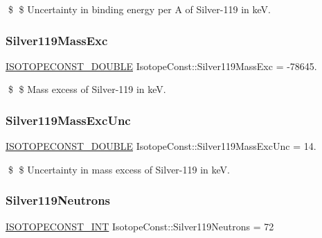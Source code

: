 \$ \$ Uncertainty in binding energy per A of Silver-\/119 in keV. \mbox{\label{group___isotope_const-_silver-_ag119_ga3568193639521feebc60759800afce7d}} 
\subsubsection{\texorpdfstring{Silver119\+Mass\+Exc}{Silver119MassExc}}
{\footnotesize\ttfamily \mbox{\hyperlink{group___isotope_const-_macros_ga8f45a7272ce02c0b4c65c44636ed719a}{I\+S\+O\+T\+O\+P\+E\+C\+O\+N\+S\+T\+\_\+\+D\+O\+U\+B\+LE}} Isotope\+Const\+::\+Silver119\+Mass\+Exc = -\/78645.}

\$ \$ Mass excess of Silver-\/119 in keV. \mbox{\label{group___isotope_const-_silver-_ag119_gadf15994fc342f9b0fae238a020dd5af4}} 
\subsubsection{\texorpdfstring{Silver119\+Mass\+Exc\+Unc}{Silver119MassExcUnc}}
{\footnotesize\ttfamily \mbox{\hyperlink{group___isotope_const-_macros_ga8f45a7272ce02c0b4c65c44636ed719a}{I\+S\+O\+T\+O\+P\+E\+C\+O\+N\+S\+T\+\_\+\+D\+O\+U\+B\+LE}} Isotope\+Const\+::\+Silver119\+Mass\+Exc\+Unc = 14.}

\$ \$ Uncertainty in mass excess of Silver-\/119 in keV. \mbox{\label{group___isotope_const-_silver-_ag119_gad013187d2e89ad47afd5fdfd9871ae27}} 
\subsubsection{\texorpdfstring{Silver119\+Neutrons}{Silver119Neutrons}}
{\footnotesize\ttfamily \mbox{\hyperlink{group___isotope_const-_macros_ga5f18360b3e99483a35c32d789e62621c}{I\+S\+O\+T\+O\+P\+E\+C\+O\+N\+S\+T\+\_\+\+I\+NT}} Isotope\+Const\+::\+Silver119\+Neutrons = 72}

